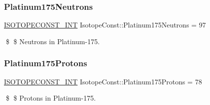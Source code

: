\subsubsection{\texorpdfstring{Platinum175\+Neutrons}{Platinum175Neutrons}}
{\footnotesize\ttfamily \mbox{\hyperlink{group___isotope_const-_macros_ga5f18360b3e99483a35c32d789e62621c}{I\+S\+O\+T\+O\+P\+E\+C\+O\+N\+S\+T\+\_\+\+I\+NT}} Isotope\+Const\+::\+Platinum175\+Neutrons = 97}

\$ \$ Neutrons in Platinum-\/175. \mbox{\label{group___isotope_const-_platinum-_pt175_ga83ec312afa85a711090d5ef1ac3552c4}} 
\subsubsection{\texorpdfstring{Platinum175\+Protons}{Platinum175Protons}}
{\footnotesize\ttfamily \mbox{\hyperlink{group___isotope_const-_macros_ga5f18360b3e99483a35c32d789e62621c}{I\+S\+O\+T\+O\+P\+E\+C\+O\+N\+S\+T\+\_\+\+I\+NT}} Isotope\+Const\+::\+Platinum175\+Protons = 78}

\$ \$ Protons in Platinum-\/175. 